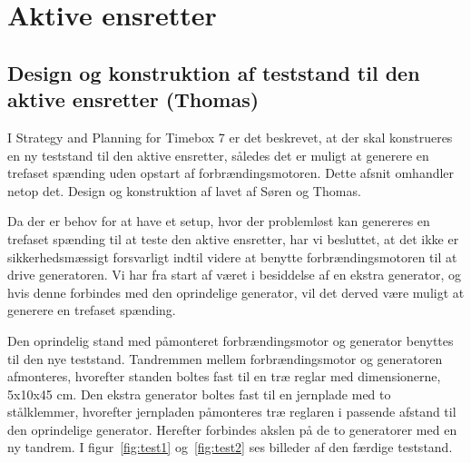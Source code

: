 \section{Aktive ensretter}
\label{sec:aktive-ensretter}

\subsection{Design og konstruktion af teststand til den aktive ensretter (Thomas)}
\label{sec:design-og-konstr}

I Strategy and Planning for Timebox 7 er det beskrevet, at der skal konstrueres en ny teststand til den aktive ensretter, således det er muligt at generere en trefaset spænding uden opstart af forbrændingsmotoren. Dette afsnit omhandler netop det. Design og konstruktion af lavet af Søren og Thomas.

Da der er behov for at have et setup, hvor der problemløst kan genereres en trefaset spænding til at teste den aktive ensretter, har vi besluttet, at det ikke er sikkerhedsmæssigt forsvarligt indtil videre at benytte forbrændingsmotoren til at drive generatoren. Vi har fra start af været i besiddelse af en ekstra generator, og hvis denne forbindes med den oprindelige generator, vil det derved være muligt at generere en trefaset spænding.

Den oprindelig stand med påmonteret forbrændingsmotor og generator benyttes til den nye teststand. Tandremmen mellem forbrændingsmotor og generatoren afmonteres, hvorefter standen boltes fast til en træ reglar med dimensionerne, 5x10x45 cm. Den ekstra generator boltes fast til en jernplade med to stålklemmer, hvorefter jernpladen påmonteres træ reglaren i passende afstand til den oprindelige generator. Herefter forbindes akslen på de to generatorer med en ny tandrem. I figur~\ref{fig:test1} og~\ref{fig:test2} ses billeder af den færdige teststand. 

